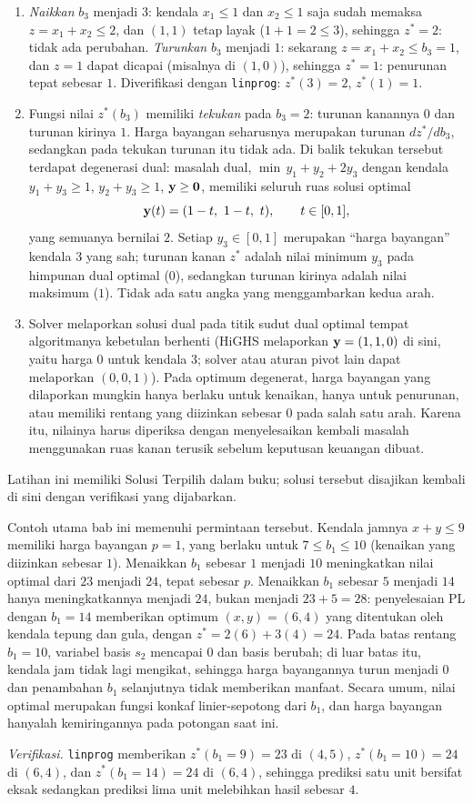 \begin{enumerate}
\item \emph{Naikkan} $b_3$ menjadi $3$: kendala $x_1 \le 1$ dan $x_2 \le 1$ saja sudah memaksa $z = x_1 + x_2 \le 2$, dan $(1,1)$ tetap layak ($1 + 1 = 2 \le 3$), sehingga $z^* = 2$: tidak ada perubahan. \emph{Turunkan} $b_3$ menjadi $1$: sekarang $z = x_1 + x_2 \le b_3 = 1$, dan $z = 1$ dapat dicapai (misalnya di $(1,0)$), sehingga $z^* = 1$: penurunan tepat sebesar $1$. Diverifikasi dengan \texttt{linprog}: $z^*(3) = 2$, $z^*(1) = 1$.
\item Fungsi nilai $z^*(b_3)$ memiliki \emph{tekukan} pada $b_3 = 2$: turunan kanannya $0$ dan turunan kirinya $1$. Harga bayangan seharusnya merupakan turunan $dz^*/db_3$, sedangkan pada tekukan turunan itu tidak ada. Di balik tekukan tersebut terdapat degenerasi dual: masalah dual, $\min\, y_1 + y_2 + 2y_3$ dengan kendala $y_1 + y_3 \ge 1$, $y_2 + y_3 \ge 1$, $\mathbf{y} \ge \mathbf{0}$, memiliki seluruh ruas solusi optimal
\[
\mathbf{y}(t) = (1 - t,\ 1 - t,\ t), \qquad t \in [0, 1],
\]
yang semuanya bernilai $2$. Setiap $y_3 \in [0,1]$ merupakan ``harga bayangan'' kendala 3 yang sah; turunan kanan $z^*$ adalah nilai minimum $y_3$ pada himpunan dual optimal ($0$), sedangkan turunan kirinya adalah nilai maksimum ($1$). Tidak ada satu angka yang menggambarkan kedua arah.
\item Solver melaporkan solusi dual pada titik sudut dual optimal tempat algoritmanya kebetulan berhenti (HiGHS melaporkan $\mathbf{y} = (1,1,0)$ di sini, yaitu harga $0$ untuk kendala 3; solver atau aturan pivot lain dapat melaporkan $(0,0,1)$). Pada optimum degenerat, harga bayangan yang dilaporkan mungkin hanya berlaku untuk kenaikan, hanya untuk penurunan, atau memiliki rentang yang diizinkan sebesar $0$ pada salah satu arah. Karena itu, nilainya harus diperiksa dengan menyelesaikan kembali masalah menggunakan ruas kanan terusik sebelum keputusan keuangan dibuat.
\end{enumerate}


Latihan ini memiliki Solusi Terpilih dalam buku; solusi tersebut disajikan kembali di sini dengan verifikasi yang dijabarkan.

Contoh utama bab ini memenuhi permintaan tersebut. Kendala jamnya $x + y \le 9$ memiliki harga bayangan $p = 1$, yang berlaku untuk $7 \le b_1 \le 10$ (kenaikan yang diizinkan sebesar $1$). Menaikkan $b_1$ sebesar $1$ menjadi $10$ meningkatkan nilai optimal dari $23$ menjadi $24$, tepat sebesar $p$. Menaikkan $b_1$ sebesar $5$ menjadi $14$ hanya meningkatkannya menjadi $24$, bukan menjadi $23 + 5 = 28$: penyelesaian PL dengan $b_1 = 14$ memberikan optimum $(x, y) = (6, 4)$ yang ditentukan oleh kendala tepung dan gula, dengan $z^* = 2(6) + 3(4) = 24$. Pada batas rentang $b_1 = 10$, variabel basis $s_2$ mencapai $0$ dan basis berubah; di luar batas itu, kendala jam tidak lagi mengikat, sehingga harga bayangannya turun menjadi $0$ dan penambahan $b_1$ selanjutnya tidak memberikan manfaat. Secara umum, nilai optimal merupakan fungsi konkaf linier-sepotong dari $b_1$, dan harga bayangan hanyalah kemiringannya pada potongan saat ini.

\emph{Verifikasi.} \texttt{linprog} memberikan $z^*(b_1 = 9) = 23$ di $(4,5)$, $z^*(b_1 = 10) = 24$ di $(6,4)$, dan $z^*(b_1 = 14) = 24$ di $(6,4)$, sehingga prediksi satu unit bersifat eksak sedangkan prediksi lima unit melebihkan hasil sebesar $4$.
